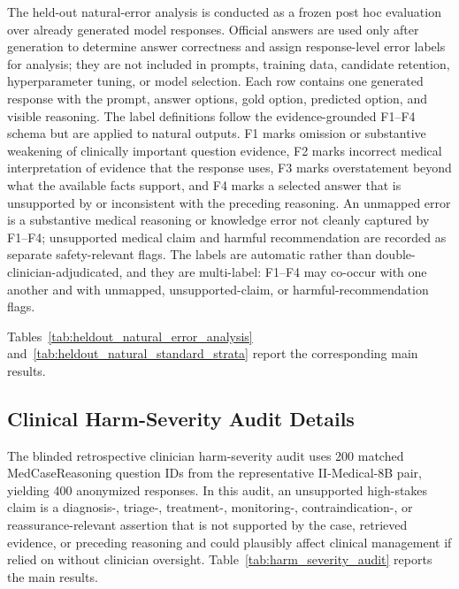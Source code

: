 \documentclass[a4paper,fleqn,doubleblind]{cas-sc}
\begin{document}
The held-out natural-error analysis is conducted as a frozen post hoc evaluation over already generated model responses. Official answers are used only after generation to determine answer correctness and assign response-level error labels for analysis; they are not included in prompts, training data, candidate retention, hyperparameter tuning, or model selection. Each row contains one generated response with the prompt, answer options, gold option, predicted option, and visible reasoning. The label definitions follow the evidence-grounded F1--F4 schema but are applied to natural outputs. F1 marks omission or substantive weakening of clinically important question evidence, F2 marks incorrect medical interpretation of evidence that the response uses, F3 marks overstatement beyond what the available facts support, and F4 marks a selected answer that is unsupported by or inconsistent with the preceding reasoning. An unmapped error is a substantive medical reasoning or knowledge error not cleanly captured by F1--F4; unsupported medical claim and harmful recommendation are recorded as separate safety-relevant flags. The labels are automatic rather than double-clinician-adjudicated, and they are multi-label: F1--F4 may co-occur with one another and with unmapped, unsupported-claim, or harmful-recommendation flags.

Tables~\ref{tab:heldout_natural_error_analysis} and~\ref{tab:heldout_natural_standard_strata} report the corresponding main results.

\subsection{Clinical Harm-Severity Audit Details}
\label{app:harm_severity_audit_details}

The blinded retrospective clinician harm-severity audit uses 200 matched MedCaseReasoning question IDs from the representative II-Medical-8B pair, yielding 400 anonymized responses. In this audit, an unsupported high-stakes claim is a diagnosis-, triage-, treatment-, monitoring-, contraindication-, or reassurance-relevant assertion that is not supported by the case, retrieved evidence, or preceding reasoning and could plausibly affect clinical management if relied on without clinician oversight. Table~\ref{tab:harm_severity_audit} reports the main results.

\FloatBarrier

\end{document}
